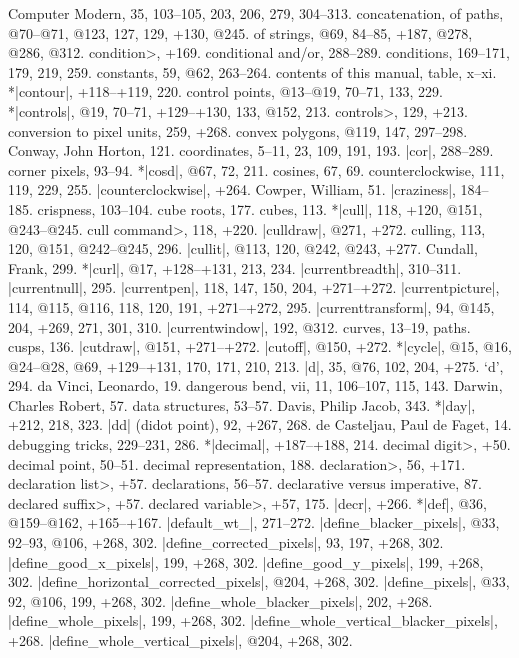 Computer Modern, 35, 103--105, 203, 206, 279, 304--313.
concatenation, of paths, @70--@71, @123, 127, 129, +130, @245.
\sub of strings, @69, 84--85, +187, @278, @286, @312.
\<condition>, +169.
conditional and/or, 288--289.
conditions, 169--171, 179, 219, 259.
constants, 59, @62, 263--264.
contents of this manual, table, x--xi.
*|contour|, +118--+119, 220.
control points, @13--@19, 70--71, 133, 229.
*|controls|, @19, 70--71, +129--+130, 133, @152, 213.
\<controls>, 129, +213.
conversion to pixel units, 259, +268.
convex polygons, @119, 147, 297--298.
Conway, John Horton, 121.
coordinates, 5--11, 23, 109, 191, 193.
|cor|, 288--289.
corner pixels, 93--94.
*|cosd|, @67, 72, 211.
cosines, 67, 69.
counterclockwise, 111, 119, 229, 255.
|counterclockwise|, +264.
Cowper, William, 51.
|craziness|, 184--185.
crispness, 103--104.
cube roots, 177.
cubes, 113.
*|cull|, 118, +120, @151, @243--@245.
\<cull command>, 118, +220.
|culldraw|, @271, +272.
culling, 113, 120, @151, @242--@245, 296.
|cullit|, @113, 120, @242, @243, +277.
Cundall, Frank, 299.
*|curl|, @17, +128--+131, 213, 234.
|currentbreadth|, 310--311.
|currentnull|, 295.
|currentpen|, 118, 147, 150, 204, +271--+272.
|currentpicture|, 114, @115, @116, 118, 120, 191, +271--+272, 295.
|currenttransform|, 94, @145, 204, +269, 271, 301, 310.
|currentwindow|, 192, @312.
curves, 13--19, \see paths.
cusps, 136.
|cutdraw|, @151, +271--+272.
|cutoff|, @150, +272.
*|cycle|, @15, @16, @24--@28, @69, +129--+131, 170, 171, 210, 213.
\newletter
|d|, 35, @76, 102, 204, +275.
`d', 294.
da Vinci, Leonardo, 19.
dangerous bend, vii, 11, 106--107, 115, 143.
Darwin, Charles Robert, 57.
data structures, 53--57.
Davis, Philip Jacob, 343.
*|day|, +212, 218, 323.
|dd| (didot point), 92, +267, 268.
de Casteljau, Paul de Faget, 14.
debugging tricks, 229--231, 286.
*|decimal|, +187--+188, 214.
\<decimal digit>, +50.
decimal point, 50--51.
decimal representation, 188.
\<declaration>, 56, +171.
\<declaration list>, +57.
declarations, 56--57.
declarative versus imperative, 87.
\<declared suffix>, +57.
\<declared variable>, +57, 175.
|decr|, +266.
*|def|, @36, @159--@162, +165--+167.
|default_wt_|, 271--272.
|define_blacker_pixels|, @33, 92--93, @106, +268, 302.
|define_corrected_pixels|, 93, 197, +268, 302.
|define_good_x_pixels|, 199, +268, 302.
|define_good_y_pixels|, 199, +268, 302.
|define_horizontal_corrected_pixels|, @204, +268, 302.
|define_pixels|, @33, 92, @106, 199, +268, 302.
|define_whole_blacker_pixels|, 202, +268.
|define_whole_pixels|, 199, +268, 302.
|define_whole_vertical_blacker_pixels|, +268.
|define_whole_vertical_pixels|, @204, +268, 302.
